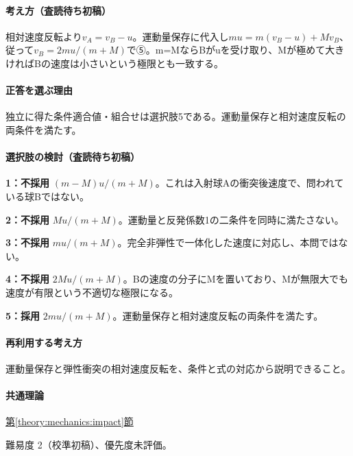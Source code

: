 \paragraph{考え方（査読待ち初稿）} 相対速度反転より\(v_A=v_B-u\)。運動量保存に代入し\(mu=m(v_B-u)+Mv_B\)、従って\(v_B=2mu/(m+M)\)で⑤。m=\allowbreak{}MならBがuを受け取り、Mが極めて大きければBの速度は小さいという極限とも一致する。

\paragraph{正答を選ぶ理由} 独立に得た条件適合値・組合せは選択肢5である。運動量保存と相対速度反転の両条件を満たす。

\paragraph{選択肢の検討（査読待ち初稿）}\mbox{}\par

\noindent\textbf{1：不採用} \((m-M)u/(m+M)\)。これは入射球Aの衝突後速度で、問われている球Bではない。\par

\noindent\textbf{2：不採用} \(Mu/(m+M)\)。運動量と反発係数1の二条件を同時に満たさない。\par

\noindent\textbf{3：不採用} \(mu/(m+M)\)。完全非弾性で一体化した速度に対応し、本問ではない。\par

\noindent\textbf{4：不採用} \(2Mu/(m+M)\)。Bの速度の分子にMを置いており、Mが無限大でも速度が有限という不適切な極限になる。\par

\noindent\textbf{5：採用} \(2mu/(m+M)\)。運動量保存と相対速度反転の両条件を満たす。\par

\paragraph{再利用する考え方} 運動量保存と弾性衝突の相対速度反転を、条件と式の対応から説明できること。

\paragraph{共通理論} \hyperref[theory:mechanics:impact]{第\ref*{theory:mechanics:impact}節}

\par 難易度 2（校準初稿）、優先度未評価。

